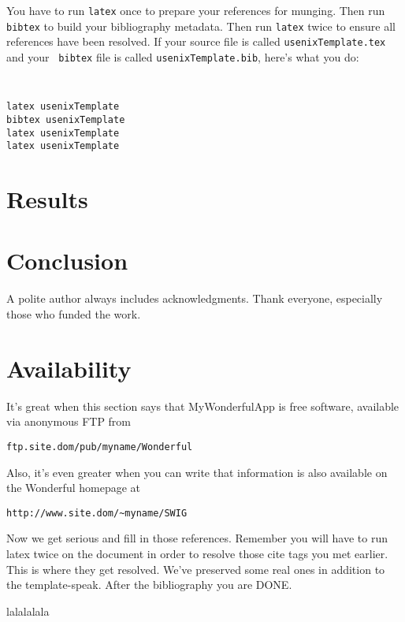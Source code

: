 \documentclass[letterpaper,twocolumn,10pt]{article}
\begin{document}
You have to run {\tt latex} once to prepare your references for
munging.  Then run {\tt bibtex} to build your bibliography metadata.
Then run {\tt latex} twice to ensure all references have been resolved.
If your source file is called {\tt usenixTemplate.tex} and your {\tt
  bibtex} file is called {\tt usenixTemplate.bib}, here's what you do:
{\tt \small
\begin{verbatim}
latex usenixTemplate
bibtex usenixTemplate
latex usenixTemplate
latex usenixTemplate
\end{verbatim}
}

\section{Results}

\section{Conclusion}

A polite author always includes acknowledgments.  Thank everyone,
especially those who funded the work. 

\section{Availability}

It's great when this section says that MyWonderfulApp is free software, 
available via anonymous FTP from

\begin{center}
{\tt ftp.site.dom/pub/myname/Wonderful}\\
\end{center}

Also, it's even greater when you can write that information is also 
available on the Wonderful homepage at 

\begin{center}
{\tt http://www.site.dom/\~{}myname/SWIG}
\end{center}

Now we get serious and fill in those references.  Remember you will
have to run latex twice on the document in order to resolve those
cite tags you met earlier.  This is where they get resolved.
We've preserved some real ones in addition to the template-speak.
After the bibliography you are DONE.

{\footnotesize 
}
lalalalala


\theendnotes
\end{document}
